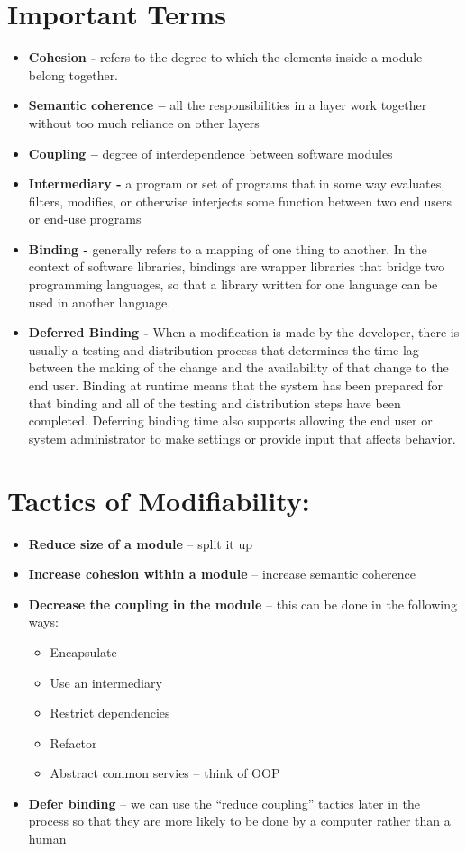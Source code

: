 \documentclass[a4paper]{report}
\begin{document}
\section{Important Terms}
\begin{itemize}
\item \textbf{Cohesion -} refers to the degree to which the elements inside a module belong together.
\item \textbf{Semantic coherence –} all the responsibilities in a layer work together without too much reliance on other layers
\item \textbf{Coupling –} degree of interdependence between software modules
\item \textbf{Intermediary -} a program or set of programs that in some way evaluates, filters, modifies, or otherwise interjects some function between two end users or end-use programs
\item \textbf{Binding -} generally refers to a mapping of one thing to another. In the context of software libraries, bindings are wrapper libraries that bridge two programming languages, so that a library written for one language can be used in another language.
\item \textbf{Deferred Binding -} When a modification is made by the developer, there is usually a testing and distribution process that determines the time lag between the making of the change and the availability of that change to the end user. Binding at runtime means that the system has been prepared for that binding and all of the testing and distribution steps have been completed. Deferring binding time also supports allowing the end user or system administrator to make settings or provide input that affects behavior.
\end{itemize}

\section{Tactics of Modifiability:}
\begin{itemize}
  \item \textbf{Reduce size of a module} – split it up
  \item \textbf{Increase cohesion within a module} – increase semantic coherence
  \item \textbf{Decrease the coupling in the module} – this can be done in the following ways:
   \begin{itemize}
   \item Encapsulate
   \item Use an intermediary
   \item Restrict dependencies
   \item Refactor
   \item Abstract common servies – think of OOP
   \end{itemize}
   \item \textbf{Defer binding} – we can use the “reduce coupling” tactics later in the process so that they   are more likely to be done by a computer rather than a human
\end{itemize}
\end{document}
